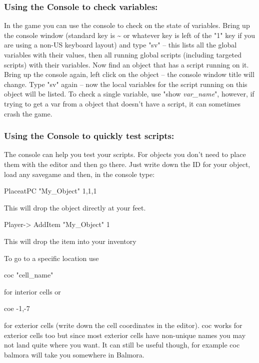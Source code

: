 \hypertarget{using-the-console-to-check-variables}{%
\subsubsection{Using the Console to check
variables:}\label{using-the-console-to-check-variables}}

In the game you can use the console to check on the state of variables.
Bring up the console window (standard key is \textasciitilde{} or
whatever key is left of the "1" key if you are using a non-US keyboard
layout) and type "sv" -- this lists all the global variables with their
values, then all running global scripts (including targeted scripts)
with their variables. Now find an object that has a script running on
it. Bring up the console again, left click on the object -- the console
window title will change. Type "sv" again -- now the local variables for
the script running on this object will be listed. To check a single
variable, use "show \emph{var\_name}", however, if trying to get a var
from a object that doesn't have a script, it can sometimes crash the
game.

\hypertarget{using-the-console-to-quickly-test-scripts}{%
\subsubsection{Using the Console to quickly test
scripts:}\label{using-the-console-to-quickly-test-scripts}}

The console can help you test your scripts. For objects you don't need
to place them with the editor and then go there. Just write down the ID
for your object, load any savegame and then, in the console type:

PlaceatPC "My\_Object" 1,1,1

This will drop the object directly at your feet.

Player-> AddItem "My\_Object" 1

This will drop the item into your inventory

To go to a specific location use

coc "cell\_name"

for interior cells or

coe -1,-7

for exterior cells (write down the cell coordinates in the editor). coc
works for exterior cells too but since most exterior cells have
non-unique names you may not land quite where you want. It can still be
useful though, for example coc balmora will take you somewhere in
Balmora.


